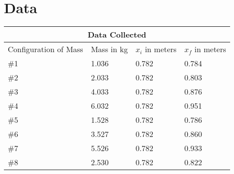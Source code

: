 \chapter{Data}

\begin{tabular}{ |p{2cm}|p{2cm}|p{2cm}|p{2cm}| }
  \hline
  \multicolumn{4}{|c|}{Data Collected} \\
  \hline
  Configuration of Mass & Mass in kg & $x_i$ in meters & $x_f$ in meters \\
  \hline
  \#1& 1.036 & 0.782 & 0.784\\
  \hline
  \#2& 2.033 & 0.782 & 0.803\\
  \hline
  \#3& 4.033 & 0.782 & 0.876\\
  \hline
  \#4& 6.032 & 0.782 & 0.951\\
  \hline
  \#5& 1.528 & 0.782 & 0.786\\
  \hline
  \#6& 3.527 & 0.782 & 0.860\\
  \hline
  \#7& 5.526 & 0.782 & 0.933\\
  \hline
  \#8& 2.530 & 0.782 & 0.822\\
  \hline
\end{tabular}
